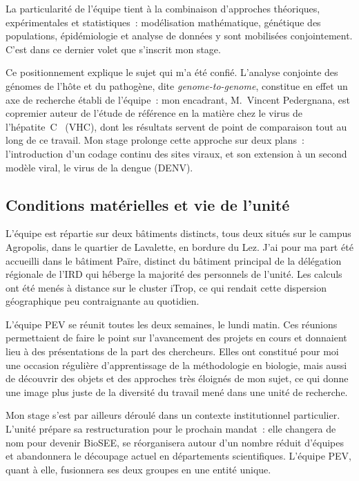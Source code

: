 \documentclass[11pt,a4paper]{article}
\begin{document}
La particularité de l'équipe tient à la combinaison d'approches théoriques, expérimentales et
statistiques~: modélisation mathématique, génétique des populations, épidémiologie et analyse de
données y sont mobilisées conjointement. C'est dans ce dernier volet que s'inscrit mon stage.

Ce positionnement explique le sujet qui m'a été confié. L'analyse conjointe des génomes de l'hôte et
du pathogène, dite \textit{genome-to-genome}, constitue en effet un axe de recherche établi de
l'équipe~: mon encadrant, M.~Vincent Pedergnana, est copremier auteur de l'étude de référence en la
matière chez le virus de l'hépatite~C~\cite{Ansari2017} (VHC), dont les résultats servent de point de
comparaison tout au long de ce travail. Mon stage prolonge cette approche sur deux plans~:
l'introduction d'un codage continu des sites viraux, et son extension à un second modèle viral,
le virus de la dengue (DENV).


\subsection{Conditions matérielles et vie de l'unité}

L'équipe est répartie sur deux bâtiments distincts, tous deux situés sur le campus Agropolis, dans
le quartier de Lavalette, en bordure du Lez. J'ai pour ma part été accueilli dans le bâtiment
Païre, distinct du bâtiment principal de la
délégation régionale de l'IRD qui héberge la majorité des personnels de l'unité. Les calculs ont
été menés à distance sur le cluster iTrop, ce qui rendait cette dispersion géographique peu
contraignante au quotidien.

L'équipe PEV se réunit toutes les deux semaines, le lundi matin.
Ces réunions permettaient de faire le point sur l'avancement des projets en cours et donnaient lieu
à des présentations de la part des chercheurs. Elles ont constitué pour moi une
occasion régulière d'apprentissage de la méthodologie en biologie, mais
aussi de découvrir des objets et des approches très éloignés de mon sujet, ce qui donne une image
plus juste de la diversité du travail mené dans une unité de recherche.


Mon stage s'est par ailleurs déroulé dans un contexte institutionnel particulier. L'unité prépare
sa restructuration pour le prochain mandat~: elle changera de nom pour devenir BioSEE,
 se réorganisera autour d'un nombre réduit d'équipes
et abandonnera le découpage actuel en départements scientifiques. L'équipe PEV, quant à elle,
fusionnera ses deux groupes en une entité unique.
\end{document}
